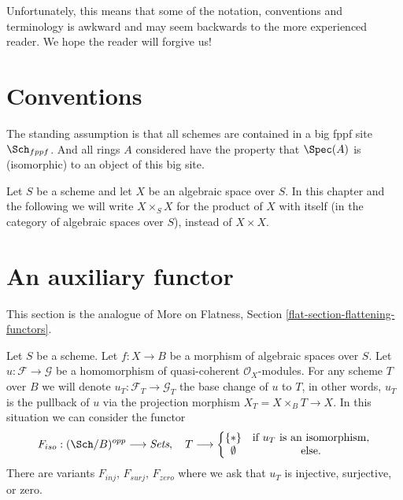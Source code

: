 \medskip\noindent
Unfortunately, this means that some of the notation, conventions and
terminology is awkward and may seem backwards to the more experienced
reader. We hope the reader will forgive us!





\section{Conventions}
\label{section-conventions}

\noindent
The standing assumption is that all schemes are contained in
a big fppf site $\Sch_{fppf}$. And all rings $A$ considered
have the property that $\Spec(A)$ is (isomorphic) to an
object of this big site.

\medskip\noindent
Let $S$ be a scheme and let $X$ be an algebraic space over $S$.
In this chapter and the following we will write $X \times_S X$
for the product of $X$ with itself (in the category of algebraic
spaces over $S$), instead of $X \times X$.






\section{An auxiliary functor}
\label{section-F-zero}

\noindent
This section is the analogue of
More on Flatness, Section \ref{flat-section-flattening-functors}.

\begin{situation}
\label{situation-iso}
Let $S$ be a scheme.
Let $f : X \to B$ be a morphism of algebraic spaces over $S$.
Let $u : \mathcal{F} \to \mathcal{G}$ be a homomorphism of
quasi-coherent $\mathcal{O}_X$-modules. For any scheme $T$ over
$B$ we will denote $u_T : \mathcal{F}_T \to \mathcal{G}_T$ the
base change of $u$ to $T$, in other words, $u_T$ is the pullback
of $u$ via the projection morphism $X_T = X \times_B T \to X$.
In this situation we can consider the functor
\begin{equation}
\label{equation-iso}
F_{iso} : (\Sch/B)^{opp} \longrightarrow \textit{Sets}, \quad
T \longrightarrow \left\{
\begin{matrix}
\{*\} & \text{if }u_T\text{ is an isomorphism}, \\
\emptyset & \text{else.}
\end{matrix}
\right.
\end{equation}
There are variants $F_{inj}$, $F_{surj}$, $F_{zero}$ where we ask that
$u_T$ is injective, surjective, or zero.
\end{situation}

